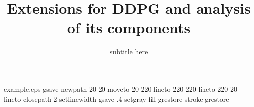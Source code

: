 %
%
%
%
%
\begin{filecontents*}{example.eps}
gsave
newpath
  20 20 moveto
  20 220 lineto
  220 220 lineto
  220 20 lineto
closepath
2 setlinewidth
gsave
  .4 setgray fill
grestore
stroke
grestore
\end{filecontents*}
%
\RequirePackage{fix-cm}
%
\documentclass[smallextended]{svjour3}       %
%
\smartqed  %
%

\usepackage{graphicx}
\usepackage{amsmath}
\usepackage{algorithm}
\usepackage{algorithmic}
\renewcommand{\algorithmicrequire}{\textbf{Initialize:}}

\usepackage{verbatim} %
\usepackage[numbers]{natbib}%

%
%
%
%
%


\title{Extensions for DDPG and analysis of its components
}
\subtitle{subtitle here}



